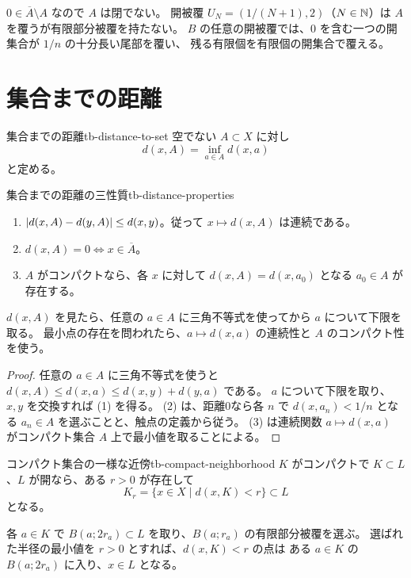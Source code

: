 $0\in\overline A\setminus A$ なので $A$ は閉でない。
開被覆 $U_N=(1/(N+1),2)$（$N\in\mathbb{N}$）は $A$ を覆うが有限部分被覆を持たない。
$B$ の任意の開被覆では、$0$ を含む一つの開集合が $1/n$ の十分長い尾部を覆い、
残る有限個を有限個の開集合で覆える。

\section{集合までの距離}

\begin{definition}{集合までの距離}{tb-distance-to-set}
空でない $A\subset X$ に対し
\[
d(x,A)=\inf_{a\in A}d(x,a)
\]
と定める。
\end{definition}

\begin{theorem}{集合までの距離の三性質}{tb-distance-properties}
\begin{enumerate}
  \item $\lvert d(x,A)-d(y,A) \rvert\le d(x,y)$。従って $x\mapsto d(x,A)$ は連続である。
  \item $d(x,A)=0\Longleftrightarrow x\in\overline A$。
  \item $A$ がコンパクトなら、各 $x$ に対して $d(x,A)=d(x,a_0)$ となる $a_0\in A$ が存在する。
\end{enumerate}
\end{theorem}

$d(x,A)$ を見たら、任意の $a\in A$ に三角不等式を使ってから $a$ について下限を取る。
最小点の存在を問われたら、$a\mapsto d(x,a)$ の連続性と $A$ のコンパクト性を使う。

\begin{proof}
任意の $a\in A$ に三角不等式を使うと
$d(x,A)\le d(x,a)\le d(x,y)+d(y,a)$ である。
$a$ について下限を取り、$x,y$ を交換すれば (1) を得る。
(2) は、距離0なら各 $n$ で $d(x,a_n)<1/n$ となる $a_n\in A$ を選ぶことと、触点の定義から従う。
(3) は連続関数 $a\mapsto d(x,a)$ がコンパクト集合 $A$ 上で最小値を取ることによる。
\end{proof}

\begin{proposition}{コンパクト集合の一様な近傍}{tb-compact-neighborhood}
$K$ がコンパクトで $K\subset L$、$L$ が開なら、ある $r>0$ が存在して
\[
K_r=\{x\in X\mid d(x,K)<r\}\subset L
\]
となる。
\end{proposition}

各 $a\in K$ で $B(a;2r_a)\subset L$ を取り、$B(a;r_a)$ の有限部分被覆を選ぶ。
選ばれた半径の最小値を $r>0$ とすれば、$d(x,K)<r$ の点は
ある $a\in K$ の $B(a;2r_a)$ に入り、$x\in L$ となる。

